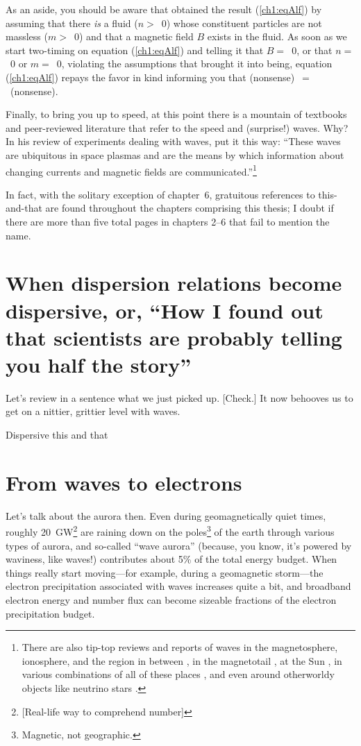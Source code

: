 As an aside, you should be aware that \Alf obtained the result
(\ref{ch1:eqAlf}) by assuming that there \emph{is} a fluid ($n >$~0)
whose constituent particles are not massless ($m >$~0) and that a
magnetic field $B$ exists in the fluid. As soon as we start two-timing
on equation (\ref{ch1:eqAlf}) and telling it that $B =$~0, or that $n
=$~0 or $m =$~0, violating the assumptions that brought it into being,
equation (\ref{ch1:eqAlf}) repays the favor in kind informing you that
(nonsense)~$=$~(nonsense).

Finally, to bring you up to speed, at this point there is a mountain
of textbooks and peer-reviewed literature that refer to the \Alf speed
and (surprise!) \Alf waves. Why? In his review of experiments dealing
with \Alf waves, \cite{Gekelman1999} put it this way: ``These waves
are ubiquitous in space plasmas and are the means by which information
about changing currents and magnetic fields are
communicated.''\footnote{There are also tip-top reviews and reports of
  \Alf waves in the magnetosphere, ionosphere, and the region in
  between \citep{Stasiewicz2000,Berthomier2011,Mottez2015}, in the
  magnetotail \citep{Keiling2009}, at the Sun
  \citep{Mathioudakis2013}, in various combinations of all of these
  places \citep{Wu2016a}, and even around otherworldy objects like
  neutrino stars \citep{Duncan1996}.} 

In fact, with the solitary exception of chapter~6, gratuitous
references to \Alf this-and-that are found throughout the chapters
comprising this thesis; I doubt if there are more than five total
pages in chapters 2--6 that fail to mention the name.


\section[When dispersion relations become dispersive]{When dispersion
  relations become dispersive, or, ``How I
  found out that scientists are probably telling you half the story''}

Let's review in a sentence what we just picked up. [Check.] It now
behooves us to get on a nittier, grittier level with \Alf waves.

Dispersive this and that

\section{From waves to electrons}

Let's talk about the aurora then. Even during geomagnetically quiet
times, roughly 20~GW\footnote{[Real-life way to comprehend number]}
\citep{Newell2009} are raining down on the poles\footnote{Magnetic, not geographic.} of the
earth through various types of aurora, and so-called ``wave aurora''
(because, you know, it's powered by waviness, like \Alf waves!)
contributes about 5\% of the total energy budget. When things really
start moving---for example, during a geomagnetic storm---the electron
precipitation associated with \Alf waves increases quite a bit, and
broadband electron energy and number flux can become sizeable
fractions of the electron precipitation budget.

